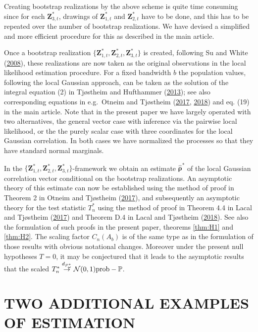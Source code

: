 \documentclass[
  12pt,
  letterpaper]{article}
\numberwithin{equation}{section}
\newcommand{\Z}{\bm{Z}}
\newcommand{\hfrho}{\widehat{\bm{\rho}}}
\begin{document}
Creating bootstrap realizations by the above scheme is quite time consuming since
for each \(\Z_{3,t}^*\), drawings of \(\Z_{1,t}^*\) and \(\Z_{2,t}^*\) have to be done, and this has to be repeated over the number of bootstrap realizations. We have devised a simplified and more efficient procedure for this as described in the main article.

Once a bootstrap realization \(\{\Z_{1,t}^*,\Z_{2,t}^*,\Z_{3,t}^*\}\) is created, following Su and White (\protect\hyperlink{ref-su2008nonparametric}{2008}), these realizations are now taken as the original observations in the local likelihood estimation procedure. For a fixed bandwidth \(b\) the population values, following the local Gaussian approach, can be taken as the solution of the integral equation (2) in Tjøstheim and Hufthammer (\protect\hyperlink{ref-tjostheim2013local}{2013}); see also corresponding equations in e.g.~Otneim and Tjøstheim (\protect\hyperlink{ref-otneim2017locally}{2017}, \protect\hyperlink{ref-otneim2017conditional}{2018}) and eq. (19) in the main article. Note that in the present paper we have largely operated with two alternatives, the general vector case with inference via the pairwise local likelihood, or the the purely scalar case with three coordinates for the local Gaussian correlation. In both cases we have normalized the processes so that they have standard normal marginals.

In the \(\{\Z_{1,t}^*,\Z_{2,t}^*,\Z_{3,t}^*\}\)-framework we obtain an estimate \(\hfrho^*\) of the local Gaussian correlation vector conditional on the bootstrap realizations. An asymptotic theory of this estimate can now be established using the method of proof in Theorem 2 in Otneim and Tjøstheim (\protect\hyperlink{ref-otneim2017locally}{2017}), and subsequently an asymptotic theory for the test statistic \(T_n^*\) using the method of proof in Theorem 4.4 in Lacal and Tjøstheim (\protect\hyperlink{ref-lacal2017local}{2017}) and Theorem D.4 in Lacal and Tjøstheim (\protect\hyperlink{ref-lacal2018estimating}{2018}). See also the formulation of such proofs in the present paper, theorems \ref{thm:H1} and \ref{thm:H2}. The scaling factor \(C_n(A_b)\) is of the same type as in the formulation of those results with obvious notational changes. Moreover under the present null hypotheses \(T = 0\), it may be conjectured that it leads to the asymptotic results that the scaled \(T_n^* \buildrel {d_{P^*_{\omega}}} \over {\to} {\cal N}(0,1)\mbox{prob}-\mathbb{P}\).

\hypertarget{two-additional-examples-of-estimation}{%
\section{TWO ADDITIONAL EXAMPLES OF ESTIMATION}\label{two-additional-examples-of-estimation}}
\end{document}
